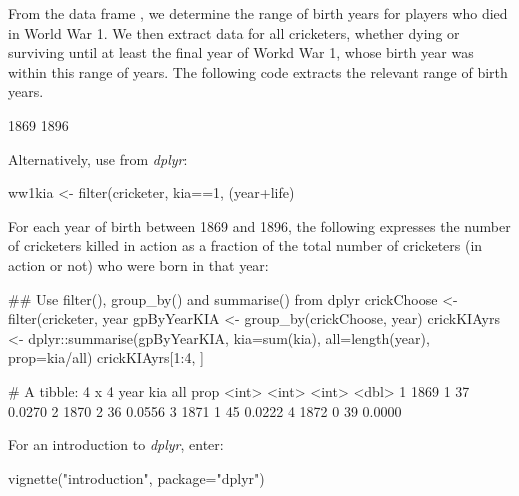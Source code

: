 From the data frame , we determine the range of birth
years for players who died in World War 1.  We then extract data for
all cricketers, whether dying or surviving until at least the final
year of Workd War 1, whose birth year was within this range of years.
The following code extracts the relevant range of birth years.
\begin{Schunk}
\begin{Soutput}
[1] 1869 1896
\end{Soutput}
\end{Schunk}

Alternatively, use  from {\em dplyr}:
\begin{Schunk}
\begin{Sinput}
ww1kia <- filter(cricketer,
                 kia==1, (year+life)%in% 1914:1918)
\end{Sinput}
\end{Schunk}

For each year of birth between 1869 and 1896, the following expresses
the number of cricketers killed in action as a fraction of the total
number of cricketers (in action or not) who were born in that year:
\begin{fullwidth}
\begin{Schunk}
\begin{Sinput}
## Use filter(), group_by() and summarise() from dplyr
crickChoose <- filter(cricketer,
                      year%in%(1869:1896), ((kia==1)|(year+life)>1918))
gpByYearKIA <- group_by(crickChoose, year)
crickKIAyrs <- dplyr::summarise(gpByYearKIA,
                                kia=sum(kia), all=length(year), prop=kia/all)
crickKIAyrs[1:4, ]
\end{Sinput}
\begin{Soutput}
# A tibble: 4 x 4
   year   kia   all   prop
  <int> <int> <int>  <dbl>
1  1869     1    37 0.0270
2  1870     2    36 0.0556
3  1871     1    45 0.0222
4  1872     0    39 0.0000
\end{Soutput}
\end{Schunk}
\end{fullwidth}

For an introduction to {\em dplyr}, enter:
\begin{Schunk}
\begin{Sinput}
vignette("introduction", package="dplyr")
\end{Sinput}
\end{Schunk}

